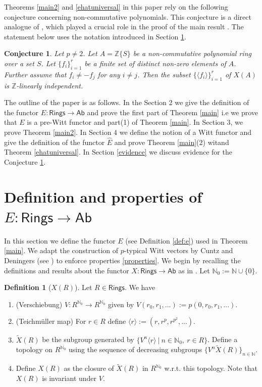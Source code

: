 \documentclass[11pt]{amsart}
\theoremstyle{plain}
\newtheorem{conjecture}[thm]{Conjecture}
\theoremstyle{definition}
\newtheorem{definition}[thm]{Definition}
\newcommand{\union}{\cup}
\renewcommand{\tilde}{\widetilde}
\newcommand{\N}{{\mathbb N}}
\newcommand{\Z}{{\mathbb Z}}
\newcommand{\ab}[1]{\langle {#1} \rangle}
\newcommand{\Rings}{{\mathsf{Rings}}}
\newcommand{\Ab}{{\mathsf{Ab}}}
\begin{document}
\noindent Theorems \ref{main2} and \ref{ehatuniversal} in this paper rely on the following conjecture concerning non-commutative polynomials. This conjecture is a direct analogue of \cite[Lemma 4.2]{ps}, which played a crucial role in the proof of the main result \cite[Theorem 1.6]{ps}. The statement below uses the notation introduced in Section \ref{section:e}.

\begin{conjecture}\label{zind}
Let $p\neq 2$. Let $A = \Z\{S\}$ be a non-commutative polynomial ring over a set $S$. Let $\{f_i\}_{i=1}^r$ be a finite set of distinct non-zero elements of $A$. Further assume  that $f_i\neq -f_j$ for any $i\neq j$. Then the subset $\{\ab{f_i}\}_{i=1}^r$ of $X(A)$ is $\Z$-linearly independent. 
\end{conjecture}

The outline of the paper is as follows. In the Section 2 we give the definition of the functor $E: \Rings \to \Ab$ and prove the first part of Theorem \ref{main} i.e we prove that $E$ is a pre-Witt functor and part(1) of Theorem \ref{main}. In Section 3, we prove Theorem \ref{main2}. In Section 4 we define the notion of a Witt functor and give the definition of the functor $\hat{E}$ and prove Theorem \ref{main}(2) witand Theorem \ref{ehatuniversal}. In Section \ref{evidence} we discuss evidence for the Conjecture \ref{zind}. 


\section{Definition and properties of $E: \Rings \to \Ab$} \label{section:e}

In this section we define the functor $E$ (see Definition \ref{def:e}) used in Theorem \ref{main}. We adapt the construction of $p$-typical Witt vectors by Cuntz and Deningers (see \cite{cd}) to enforce properties \ref{properties}.  We begin by recalling the definitions and results about the functor $X : \Rings \to \Ab$ as in \cite{cd}. Let $\N_0 := \N\union \{0\}$.

\begin{definition}[$X(R)$]\label{def:ncxa} Let $R \in \Rings$. We have
\begin{enumerate}
\item (Verschiebung) $V: R^{\N_0}\to R^{\N_0}$ given by 
$ V(r_0,r_1,...) := p(0, r_0,r_1,...)$.
\item (Teichm\"{u}ller map) For $r\in R$ define 
$ \ab{r}:= (r,r^p,r^{p^2},...)$.
\item $\tilde{X}(R)$ be the subgroup generated by $\{V^n\ab{r} \ | \ n\in \N_0, \ r\in R\}$. Define a topology on $R^{\N_0}$ using the sequence of decreasing subgroups  $\{V^n\tilde{X}(R) \}_{n\in\N}$.  
\item Define $X(R)$ as the closure of $\tilde{X}(R)$ in $R^{\N_0}$ w.r.t. this topology. Note that $X(R)$ is invariant under $V$.
\end{enumerate}
\end{definition}
\end{document}

